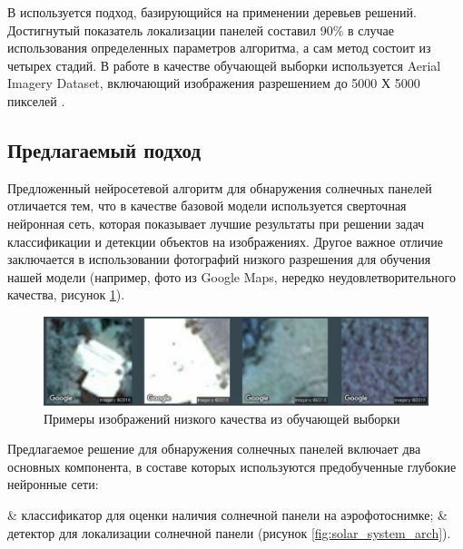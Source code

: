 В \cite[c.~4-5]{malof2016} используется подход, базирующийся на применении деревьев решений. Достигнутый показатель локализации панелей составил 90\% в случае использования определенных параметров алгоритма, а сам метод состоит из четырех стадий. В работе в качестве обучающей выборки используется Aerial Imagery Dataset, включающий изображения разрешением до 5000 Х 5000 пикселей \cite[c.~6]{bradbury2016}.

\subsection{Предлагаемый подход}

Предложенный нейросетевой алгоритм для обнаружения солнечных панелей отличается тем, что в качестве базовой модели используется сверточная нейронная сеть, которая показывает лучшие результаты при решении задач классификации и детекции объектов на изображениях. Другое важное отличие заключается в использовании фотографий низкого разрешения для обучения нашей модели (например, фото из Google Maps, нередко неудовлетворительного качества, рисунок \ref{fig:example_of_images}). 

\begin{figure}[ht]
	\centering
	\includegraphics[width=16cm]{man-source/images/ch4/pic4-16.png}
	\caption{Примеры изображений низкого качества из обучающей выборки}
	\label{fig:example_of_images}
\end{figure}

Предлагаемое решение для обнаружения солнечных панелей включает два основных компонента, в составе которых используются предобученные глубокие нейронные сети: 

\begin{easylistNum}
    & классификатор для оценки наличия солнечной панели на аэрофотоснимке;
    & детектор для локализации солнечной панели (рисунок \ref{fig:solar_system_arch}).
\end{easylistNum}

